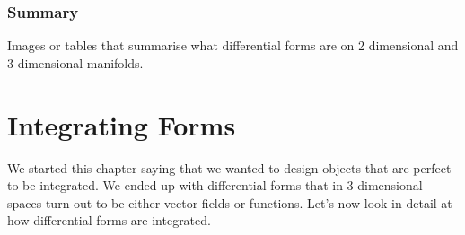 \subsubsection*{Summary}
Images or tables that summarise what differential forms are on 2 dimensional and 3 dimensional manifolds. 

%

\section{Integrating Forms}
 We started this chapter saying that we wanted to design objects that are perfect to be integrated. We ended up with differential forms that in 3-dimensional spaces turn out to be either vector fields or functions. Let's now look in detail at how differential forms are integrated. 

